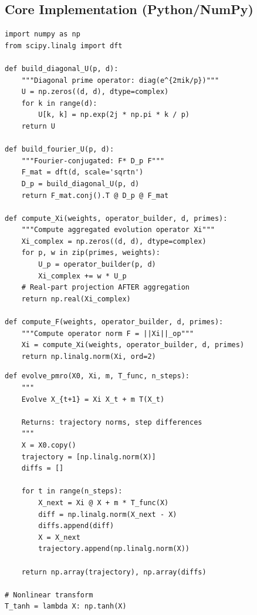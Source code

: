 \documentclass[11pt,a4paper]{article}
\begin{document}
\subsection{Core Implementation (Python/NumPy)}

\begin{lstlisting}[caption={Prime evolution operator construction}]
import numpy as np
from scipy.linalg import dft

def build_diagonal_U(p, d):
    """Diagonal prime operator: diag(e^{2πik/p})"""
    U = np.zeros((d, d), dtype=complex)
    for k in range(d):
        U[k, k] = np.exp(2j * np.pi * k / p)
    return U

def build_fourier_U(p, d):
    """Fourier-conjugated: F* D_p F"""
    F_mat = dft(d, scale='sqrtn')
    D_p = build_diagonal_U(p, d)
    return F_mat.conj().T @ D_p @ F_mat

def compute_Xi(weights, operator_builder, d, primes):
    """Compute aggregated evolution operator Xi"""
    Xi_complex = np.zeros((d, d), dtype=complex)
    for p, w in zip(primes, weights):
        U_p = operator_builder(p, d)
        Xi_complex += w * U_p
    # Real-part projection AFTER aggregation
    return np.real(Xi_complex)

def compute_F(weights, operator_builder, d, primes):
    """Compute operator norm F = ||Xi||_op"""
    Xi = compute_Xi(weights, operator_builder, d, primes)
    return np.linalg.norm(Xi, ord=2)
\end{lstlisting}

\begin{lstlisting}[caption={PMRO discrete evolution}]
def evolve_pmro(X0, Xi, m, T_func, n_steps):
    """
    Evolve X_{t+1} = Xi X_t + m T(X_t)
    
    Returns: trajectory norms, step differences
    """
    X = X0.copy()
    trajectory = [np.linalg.norm(X)]
    diffs = []
    
    for t in range(n_steps):
        X_next = Xi @ X + m * T_func(X)
        diff = np.linalg.norm(X_next - X)
        diffs.append(diff)
        X = X_next
        trajectory.append(np.linalg.norm(X))
    
    return np.array(trajectory), np.array(diffs)

# Nonlinear transform
T_tanh = lambda X: np.tanh(X)
\end{lstlisting}
\end{document}
